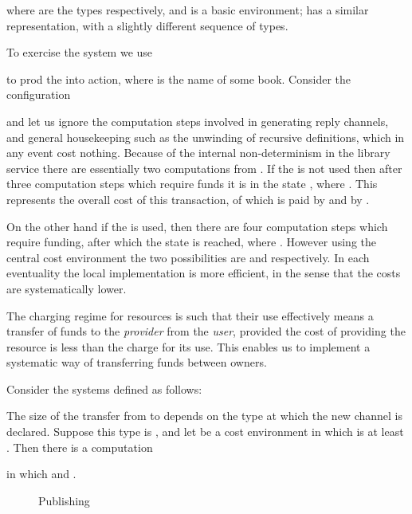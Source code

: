 \documentclass{LMCS}
\newcommand{\EndDefBox}{\null\hfill}
\newcommand{\boxHere}{\global\let\EndProof\empty\EndDefBox}
\begin{document}
\begin{exa}
where  are the types  respectively,
and  is a basic environment;   has a similar representation, with a slightly different
sequence of types. 


To exercise the system we use

to prod the  into action, 
where  is the name of some book. 
Consider the configuration 

and let us ignore the computation steps involved in generating reply
channels, and general housekeeping such as the unwinding of recursive
definitions, which in any event cost nothing.  Because of the internal
non-determinism in the library service there are essentially two
computations from . If the  is not used then after
three computation steps which require funds it is in the state , where . This represents the overall cost of
this transaction,  of which is paid by  and  by . 

On the other hand if the    is used, then there are 
four computation steps which require funding, after which the state 
 is reached, where .  However using
the central cost environment  the two possibilities
are  and
 respectively.  In each eventuality
the local implementation is more efficient, in the sense that the costs are systematically
lower. 
\boxHere
\end{exa}

The charging regime for resources is such that their use effectively
means a transfer of funds to the \emph{provider} from the \emph{user},
provided the cost of providing the resource is less than the charge
for its use. This enables us to implement a systematic way of
transferring funds between owners.
\begin{exa}\label{ex:fund.transfer} 
Consider the systems defined as follows:
  
The size of the transfer from  to  depends on the type  at which the
new channel  is declared. Suppose this type is , and let  be a cost environment
in which  is at least .  Then there is a computation

in which  and .
\boxHere
\end{exa}
\begin{figure}[t]


  
  \caption{Publishing}
  \label{fig:publish}
\end{figure}
\end{document}
